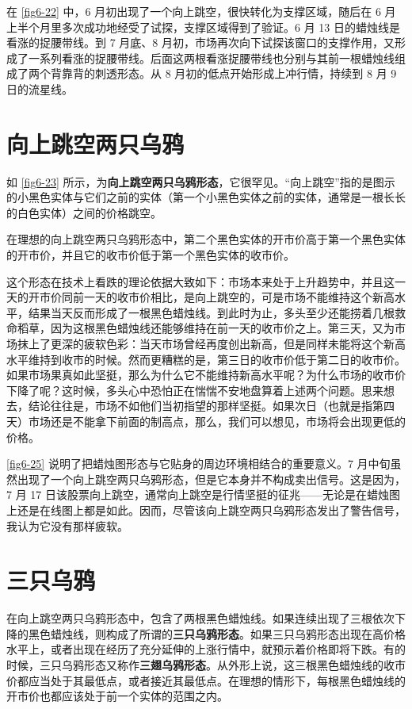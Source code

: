 在 \autoref{fig6-22} 中，6 月初出现了一个向上跳空，很快转化为支撑区域，随后在 6 月上半个月里多次成功地经受了试探，支撑区域得到了验证。6 月 13 日的蜡烛线是看涨的捉腰带线。到 7 月底、8 月初，市场再次向下试探该窗口的支撑作用，又形成了一系列看涨的捉腰带线。后面这两根看涨捉腰带线也分别与其前一根蜡烛线组成了两个背靠背的刺透形态。从 8 月初的低点开始形成上冲行情，持续到 8 月 9 日的流星线。

\section{向上跳空两只乌鸦}
如 \autoref{fig6-23} 所示，为\textbf{向上跳空两只乌鸦形态}，它很罕见。“向上跳空”指的是图示的小黑色实体与它们之前的实体（第一个小黑色实体之前的实体，通常是一根长长的白色实体）之间的价格跳空。


在理想的向上跳空两只乌鸦形态中，第二个黑色实体的开市价高于第一个黑色实体的开市价，并且它的收市价低于第一个黑色实体的收市价。

这个形态在技术上看跌的理论依据大致如下：市场本来处于上升趋势中，并且这一天的开市价同前一天的收市价相比，是向上跳空的，可是市场不能维持这个新高水平，结果当天反而形成了一根黑色蜡烛线。到此时为止，多头至少还能捞着几根救命稻草，因为这根黑色蜡烛线还能够维持在前一天的收市价之上。第三天，又为市场抹上了更深的疲软色彩：当天市场曾经再度创出新高，但是同样未能将这个新高水平维持到收市的时候。然而更糟糕的是，第三日的收市价低于第二日的收市价。如果市场果真如此坚挺，那么为什么它不能维持新高水平呢？为什么市场的收市价下降了呢？这时候，多头心中恐怕正在惴惴不安地盘算着上述两个问题。思来想去，结论往往是，市场不如他们当初指望的那样坚挺。如果次日（也就是指第四天）市场还是不能拿下前面的制高点，那么，我们可以想见，市场将会出现更低的价格。

\autoref{fig6-25} 说明了把蜡烛图形态与它贴身的周边环境相结合的重要意义。7 月中旬虽然出现了一个向上跳空两只乌鸦形态，但是它本身并不构成卖出信号。这是因为，7 月 17 日该股票向上跳空，通常向上跳空是行情坚挺的征兆——无论是在蜡烛图上还是在线图上都是如此。因而，尽管该向上跳空两只乌鸦形态发出了警告信号，我认为它没有那样疲软。


\section{三只乌鸦}
在向上跳空两只乌鸦形态中，包含了两根黑色蜡烛线。如果连续出现了三根依次下降的黑色蜡烛线，则构成了所谓的\textbf{三只乌鸦形态}。如果三只乌鸦形态出现在高价格水平上，或者出现在经历了充分延伸的上涨行情中，就预示着价格即将下跌。有的时候，三只乌鸦形态又称作\textbf{三翅乌鸦形态}。从外形上说，这三根黑色蜡烛线的收市价都应当处于其最低点，或者接近其最低点。在理想的情形下，每根黑色蜡烛线的开市价也都应该处于前一个实体的范围之内。

